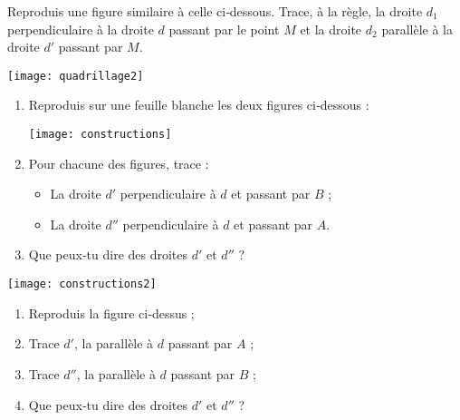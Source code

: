 \begin{exercice}[Quadrillage]
Reproduis une figure similaire à celle ci‑dessous. Trace, à la règle, la droite $d_1$ perpendiculaire à la droite $d$ passant par le point $M$ et la droite $d_2$ parallèle à la droite $d'$ passant par $M$.
\begin{center} \texttt{[image: quadrillage2]}  \end{center}
\end{exercice}


\begin{exercice}[Constructions]
\begin{enumerate}
 \item Reproduis sur une feuille blanche les deux figures ci‑dessous :
 \begin{center} \texttt{[image: constructions]}  \end{center}
 \item Pour chacune des figures, trace :
  \begin{itemize}
   \item La droite $d'$ perpendiculaire à $d$ et passant par $B$ ;
   \item La droite $d''$ perpendiculaire à $d$ et passant par $A$.
   \end{itemize}
 \item Que peux‑tu dire des droites $d'$ et $d''$ ?
 \end{enumerate}
\end{exercice}


\begin{exercice}
 \begin{center} \texttt{[image: constructions2]}  \end{center}
\begin{enumerate}
 \item Reproduis la figure ci‑dessus ;
 \item Trace $d'$, la parallèle à $d$ passant par $A$ ;
 \item Trace $d''$, la parallèle à $d$ passant par $B$ ;
 \item Que peux‑tu dire des droites $d'$ et $d''$ ?
 \end{enumerate}
\end{exercice}


\newpage



